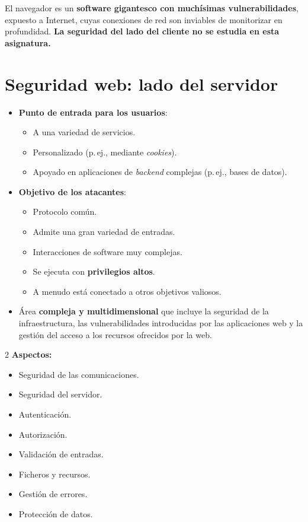 \documentclass[11pt,a4paper]{report}
\begin{document}
\begin{importante}
El navegador es un \textbf{software gigantesco con muchísimas vulnerabilidades}, expuesto a Internet, cuyas conexiones de red son inviables de monitorizar en profundidad. \textbf{La seguridad del lado del cliente no se estudia en esta asignatura.}
\end{importante}
 
\section{Seguridad web: lado del servidor}
 
\begin{itemize}
  \item \textbf{Punto de entrada para los usuarios}:
    \begin{itemize}
      \item A una variedad de servicios.
      \item Personalizado (p.\,ej., mediante \emph{cookies}).
      \item Apoyado en aplicaciones de \emph{backend} complejas (p.\,ej., bases de datos).
    \end{itemize}
  \item \textbf{Objetivo de los atacantes}:
    \begin{itemize}
      \item Protocolo común.
      \item Admite una gran variedad de entradas.
      \item Interacciones de software muy complejas.
      \item Se ejecuta con \textbf{privilegios altos}.
      \item A menudo está conectado a otros objetivos valiosos.
    \end{itemize}
  \item Área \textbf{compleja y multidimensional} que incluye la seguridad de la infraestructura, las vulnerabilidades introducidas por las aplicaciones web y la gestión del acceso a los recursos ofrecidos por la web.
\end{itemize}
 
\begin{multicols}{2}
\textbf{Aspectos:}
\begin{itemize}
  \item Seguridad de las comunicaciones.
  \item Seguridad del servidor.
  \item Autenticación.
  \item Autorización.
  \item Validación de entradas.
  \item Ficheros y recursos.
  \item Gestión de errores.
  \item Protección de datos.
\end{itemize}
\end{multicols}
 
\end{document}
